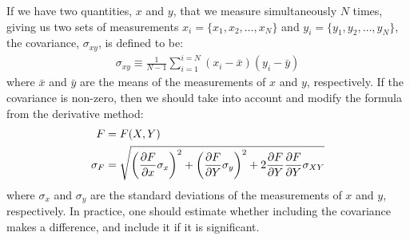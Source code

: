 If we have two quantities, $x$ and $y$, that we measure simultaneously $N$ times, giving us two sets of measurements  $x_i=\{x_1, x_2,\dots, x_N\}$ and $y_i=\{y_1, y_2,\dots, y_N\}$, the covariance, $\sigma_{xy}$, is defined to be:
\begin{align}
\sigma_{xy}\equiv\frac{1}{N-1}\sum_{i=1}^{i=N}(x_i-\bar x)(y_i-\bar y)
\end{align}
where $\bar x$ and $\bar y$ are the means of the measurements of $x$ and $y$, respectively. If the covariance is non-zero, then we should take into account and modify the formula from the derivative method:
\begin{align}
F&=F(X,Y)\nonumber\\
\sigma_{F} &= \sqrt{\left(\frac{\partial F}{\partial x}\sigma_x\right)^2 + \left(\frac{\partial F}{\partial Y} \sigma_y\right)^2+2\frac{\partial F}{\partial Y}\frac{\partial F}{\partial Y}\sigma_{XY}}
\end{align}
where $\sigma_x$ and $\sigma_y$ are the standard deviations of the measurements of $x$ and $y$, respectively. In practice, one should estimate whether including the covariance makes a difference, and include it if it is significant.
